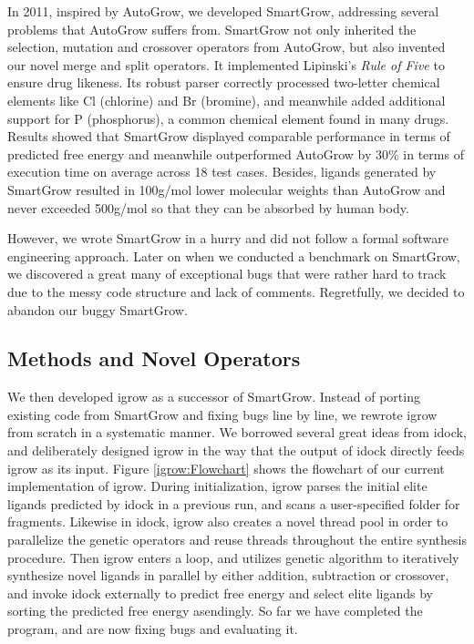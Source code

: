 In 2011, inspired by AutoGrow, we developed SmartGrow, addressing several problems that AutoGrow suffers from. SmartGrow not only inherited the selection, mutation and crossover operators from AutoGrow, but also invented our novel merge and split operators. It implemented Lipinski's \textit{Rule of Five} \citep{168} to ensure drug likeness. Its robust parser correctly processed two-letter chemical elements like Cl (chlorine) and Br (bromine), and meanwhile added additional support for P (phosphorus), a common chemical element found in many drugs. Results showed that SmartGrow displayed comparable performance in terms of predicted free energy and meanwhile outperformed AutoGrow by 30\% in terms of execution time on average across 18 test cases. Besides, ligands generated by SmartGrow resulted in 100g/mol lower molecular weights than AutoGrow and never exceeded 500g/mol so that they can be absorbed by human body.

However, we wrote SmartGrow in a hurry and did not follow a formal software engineering approach. Later on when we conducted a benchmark on SmartGrow, we discovered a great many of exceptional bugs that were rather hard to track due to the messy code structure and lack of comments. Regretfully, we decided to abandon our buggy SmartGrow.

\subsection{Methods and Novel Operators}

We then developed igrow as a successor of SmartGrow. Instead of porting existing code from SmartGrow and fixing bugs line by line, we rewrote igrow from scratch in a systematic manner. We borrowed several great ideas from idock, and deliberately designed igrow in the way that the output of idock directly feeds igrow as its input. Figure \ref{igrow:Flowchart} shows the flowchart of our current implementation of igrow. During initialization, igrow parses the initial elite ligands predicted by idock in a previous run, and scans a user-specified folder for fragments. Likewise in idock, igrow also creates a novel thread pool in order to parallelize the genetic operators and reuse threads throughout the entire synthesis procedure. Then igrow enters a loop, and utilizes genetic algorithm to iteratively synthesize novel ligands in parallel by either addition, subtraction or crossover, and invoke idock externally to predict free energy and select elite ligands by sorting the predicted free energy asendingly. So far we have completed the program, and are now fixing bugs and evaluating it.

